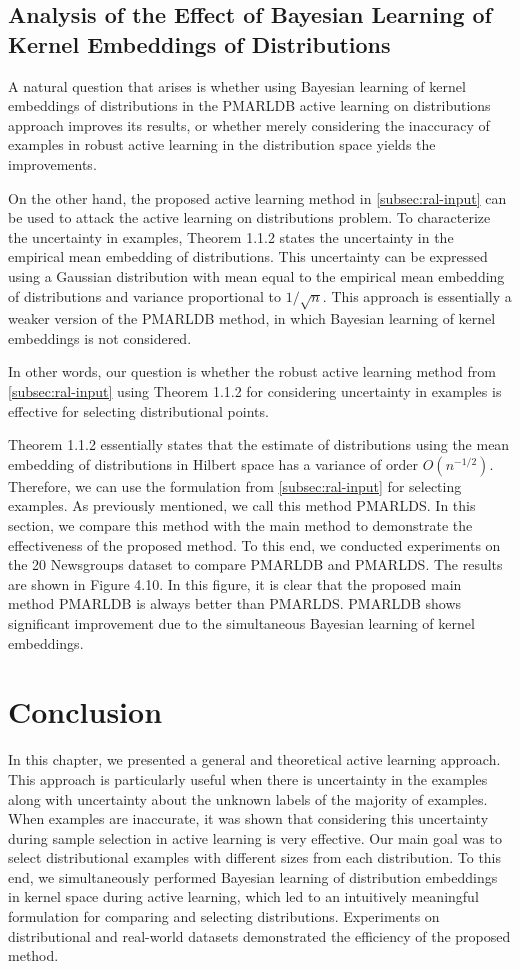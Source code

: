 	\subsection{Analysis of the Effect of Bayesian Learning of Kernel Embeddings of Distributions}
	A natural question that arises is whether using Bayesian learning of kernel embeddings of distributions in the PMARLDB active learning on distributions approach improves its results, or whether merely considering the inaccuracy of examples in robust active learning in the distribution space yields the improvements.
	
	On the other hand, the proposed active learning method in \ref{subsec:ral-input} can be used to attack the active learning on distributions problem. To characterize the uncertainty in examples, Theorem 1.1.2 states the uncertainty in the empirical mean embedding of distributions. This uncertainty can be expressed using a Gaussian distribution with mean equal to the empirical mean embedding of distributions and variance proportional to $1/\sqrt{n}$. This approach is essentially a weaker version of the PMARLDB method, in which Bayesian learning of kernel embeddings is not considered.
	
	In other words, our question is whether the robust active learning method from \ref{subsec:ral-input} using Theorem 1.1.2 for considering uncertainty in examples is effective for selecting distributional points.
	
	Theorem 1.1.2 essentially states that the estimate of distributions using the mean embedding of distributions in Hilbert space has a variance of order $O(n^{-1/2})$. Therefore, we can use the formulation from \ref{subsec:ral-input} for selecting examples. As previously mentioned, we call this method PMARLDS. In this section, we compare this method with the main method to demonstrate the effectiveness of the proposed method. To this end, we conducted experiments on the 20 Newsgroups dataset to compare PMARLDB and PMARLDS. The results are shown in Figure 4.10. In this figure, it is clear that the proposed main method PMARLDB is always better than PMARLDS. PMARLDB shows significant improvement due to the simultaneous Bayesian learning of kernel embeddings.
	
	\section{Conclusion}
	In this chapter, we presented a general and theoretical active learning approach. This approach is particularly useful when there is uncertainty in the examples along with uncertainty about the unknown labels of the majority of examples. When examples are inaccurate, it was shown that considering this uncertainty during sample selection in active learning is very effective. Our main goal was to select distributional examples with different sizes from each distribution. To this end, we simultaneously performed Bayesian learning of distribution embeddings in kernel space during active learning, which led to an intuitively meaningful formulation for comparing and selecting distributions. Experiments on distributional and real-world datasets demonstrated the efficiency of the proposed method.
	

